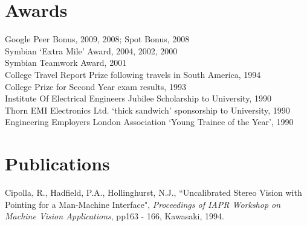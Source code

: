 \documentclass[margin = 0cm,line]{resume}
\begin{document}
\begin{resume}
    \section{\mysidestyle Awards} 

    Google Peer Bonus, 2009, 2008;  Spot Bonus, 2008                                                  \vspace{0.5mm}\\%
    Symbian `Extra Mile' Award, 2004, 2002, 2000                                                      \vspace{0.5mm}\\%
    Symbian Teamwork Award, 2001                                                                      \vspace{0.5mm}\\%
    College Travel Report Prize following travels in South America, 1994                              \vspace{0.5mm}\\%
    College Prize for Second Year exam results, 1993                                                  \vspace{0.5mm}\\%
    Institute Of Electrical Engineers Jubilee Scholarship to University, 1990                         \vspace{0.5mm}\\%
    Thorn EMI Electronics Ltd. `thick sandwich' sponsorship to University, 1990                       \vspace{0.5mm}\\%
    Engineering Employers London Association `Young Trainee of the Year', 1990

    \section{\mysidestyle Publications}

    Cipolla, R., Hadfield, P.A., Hollinghurst, N.J.,
    ``Uncalibrated Stereo Vision with Pointing for a Man-Machine Interface",
    \textsl{Proceedings of IAPR Workshop on Machine Vision Applications}, pp163 - 166, Kawasaki, 1994.


\end{resume}
\end{document}
